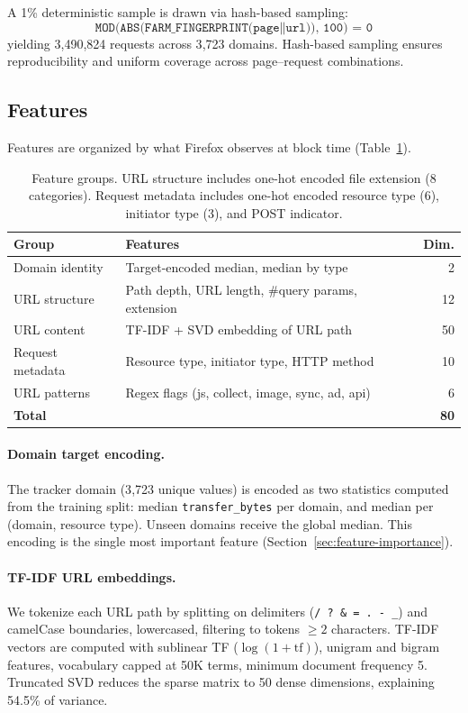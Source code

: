 \documentclass[sigconf,nonacm]{acmart}
\newcommand{\numrequests}{3{,}490{,}824\xspace}
\newcommand{\numdomains}{3{,}723\xspace}
\begin{document}
A 1\% deterministic sample is drawn via hash-based sampling:
\[
\texttt{MOD(ABS(FARM\_FINGERPRINT(page} \| \texttt{url)),~100) = 0}
\]
yielding \numrequests requests across \numdomains domains.
Hash-based sampling ensures reproducibility and uniform coverage across page--request combinations.

\subsection{Features}
\label{sec:features}

Features are organized by what Firefox observes at block time (Table~\ref{tab:features}).

\begin{table}[t]
\centering
\small
\begin{tabular}{llr}
\toprule
Group & Features & Dim. \\
\midrule
Domain identity & Target-encoded median, median by type & 2 \\
URL structure & Path depth, URL length, \#query params, extension & 12 \\
URL content & TF-IDF + SVD embedding of URL path & 50 \\
Request metadata & Resource type, initiator type, HTTP method & 10 \\
URL patterns & Regex flags (js, collect, image, sync, ad, api) & 6 \\
\midrule
\textbf{Total} & & \textbf{80} \\
\bottomrule
\end{tabular}
\caption{Feature groups. URL structure includes one-hot encoded file extension (8 categories). Request metadata includes one-hot encoded resource type (6), initiator type (3), and POST indicator.}
\label{tab:features}
\end{table}

\paragraph{Domain target encoding.}
The tracker domain (\numdomains unique values) is encoded as two statistics computed from the training split: median \texttt{transfer\_bytes} per domain, and median per (domain, resource type).
Unseen domains receive the global median.
This encoding is the single most important feature (Section~\ref{sec:feature-importance}).

\paragraph{TF-IDF URL embeddings.}
We tokenize each URL path by splitting on delimiters (\texttt{/ ? \& = . - \_}) and camelCase boundaries, lowercased, filtering to tokens $\geq 2$ characters.
TF-IDF vectors are computed with sublinear TF ($\log(1+\text{tf})$), unigram and bigram features, vocabulary capped at 50K terms, minimum document frequency 5.
Truncated SVD reduces the sparse matrix to 50 dense dimensions, explaining 54.5\% of variance.
\end{document}
